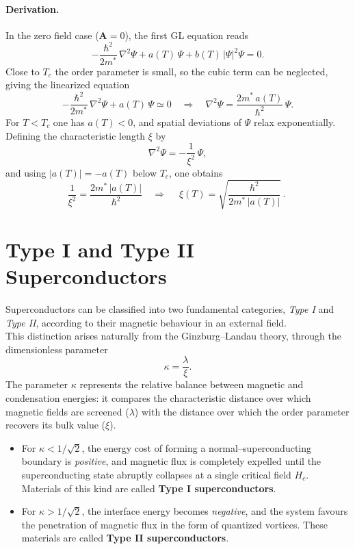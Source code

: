 \paragraph{Derivation.}

In the zero field case ($\mathbf A=0$), the first GL equation reads
\[
-\frac{\hbar^2}{2m^*}\,\nabla^2 \Psi + a(T)\,\Psi + b(T)\,|\Psi|^2\Psi = 0.
\]
Close to $T_c$ the order parameter is small, so the cubic term can be neglected, giving the linearized equation
\[
-\frac{\hbar^2}{2m^*}\,\nabla^2 \Psi + a(T)\,\Psi \simeq 0
\quad\Longrightarrow\quad
\nabla^2 \Psi = \frac{2m^*\,a(T)}{\hbar^2}\,\Psi.
\]
For $T<T_c$ one has $a(T)<0$, and spatial deviations of $\Psi$ relax exponentially. Defining the characteristic length $\xi$ by
\[
\nabla^2 \Psi = -\frac{1}{\xi^2}\,\Psi,
\]
and using $|a(T)|=-a(T)$ below $T_c$, one obtains
\begin{equation}
\frac{1}{\xi^2}=\frac{2m^*\,|a(T)|}{\hbar^2}
\quad\Longrightarrow\quad
\boxed{\;\xi(T)=\sqrt{\frac{\hbar^2}{2m^*\,|a(T)|}}\, .\;}
\end{equation}

\section{Type I and Type II Superconductors}
\label{sec:type_I_II}

Superconductors can be classified into two fundamental categories, \textit{Type I} and \textit{Type II}, according to their magnetic behaviour in an external field.\\
This distinction arises naturally from the Ginzburg–Landau theory, through the dimensionless parameter
\[
\kappa = \frac{\lambda}{\xi}.
\]
The parameter $\kappa$ represents the relative balance between magnetic and condensation energies:
it compares the characteristic distance over which magnetic fields are screened ($\lambda$) 
with the distance over which the order parameter recovers its bulk value ($\xi$).  

\begin{itemize}
  \item For $\kappa < 1/\sqrt{2}$, the energy cost of forming a normal–superconducting boundary is \emph{positive}, and magnetic flux is completely expelled until the superconducting state abruptly collapses at a single critical field $H_c$.  
  Materials of this kind are called \textbf{Type I superconductors}.
  \item For $\kappa > 1/\sqrt{2}$, the interface energy becomes \emph{negative}, and the system favours the penetration of magnetic flux in the form of quantized vortices.  
  These materials are called \textbf{Type II superconductors}.
\end{itemize}

